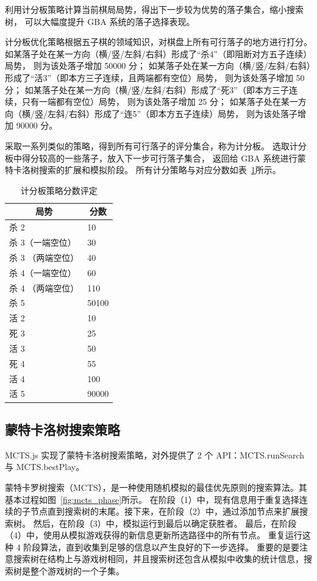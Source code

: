 \documentclass[UTF8,cs4size]{ctexart}
\begin{document}
利用计分板策略计算当前棋局局势，得出下一步较为优势的落子集合，缩小搜索树，
可以大幅度提升 GBA 系统的落子选择表现。

计分板优化策略根据五子棋的领域知识，对棋盘上所有可行落子的地方进行打分。
如某落子处在某一方向（横/竖/左斜/右斜）形成了“杀4”（即阻断对方五子连续）局势，
则为该处落子增加 50000 分；
如某落子处在某一方向（横/竖/左斜/右斜）形成了“活3”（即本方三子连续，且两端都有空位）局势，
则为该处落子增加 50 分；
如某落子处在某一方向（横/竖/左斜/右斜）形成了“死3”（即本方三子连续，只有一端都有空位）局势，
则为该处落子增加 25 分；
如某落子处在某一方向（横/竖/左斜/右斜）形成了“连5”（即本方五子连续）局势，
则为该处落子增加 90000 分。

采取一系列类似的策略，得到所有可行落子的评分集合，称为计分板。
选取计分板中得分较高的一些落子，放入下一步可行落子集合，
返回给 GBA 系统进行蒙特卡洛树搜索的扩展和模拟阶段。
所有计分策略与对应分数如表~\ref{tab:score_board}所示。

\begin{table}[htbp]
  \caption{计分板策略分数评定}
  \label{tab:score_board}
  \centering
  \begin{tabular}[c]{l|l}
    \hline
    \multicolumn{1}{c|}{\textbf{局势}} & 
    \multicolumn{1}{c}{\textbf{分数}} \\
    \hline
	  杀 2 & 10 \\
	  杀 3（一端空位）& 30 \\
	  杀 3 （两端空位）& 40 \\
	  杀 4（一端空位）& 60 \\
	  杀 4 （两端空位）& 110 \\
	  杀 5 & 50100 \\
	  活 2 & 10 \\
	  死 3 & 25 \\
	  活 3 & 50 \\
	  死 4 & 55 \\
	  活 4 & 100 \\
	  活 5 & 90000 \\
   \hline
  \end{tabular}
\end{table}


\subsection{蒙特卡洛树搜索策略}
MCTS.js 实现了蒙特卡洛树搜索策略，对外提供了 2 个 API：MCTS.runSearch 与 MCTS.bestPlay。

蒙特卡罗树搜索（MCTS），是一种使用随机模拟的最佳优先原则的搜索算法。其基本过程如图~\ref{fig:mcts_phase}所示。
在阶段（1）中，现有信息用于重复选择连续的子节点直到搜索树的末尾。接下来，在阶段（2）中，通过添加节点来扩展搜索树。
然后，在阶段（3）中，模拟运行到最后以确定获胜者。
最后，在阶段（4）中，使用从模拟游戏获得的新信息更新所选路径中的所有节点。
重复运行这种 4 阶段算法，直到收集到足够的信息以产生良好的下一步选择。
重要的是要注意搜索树在结构上与游戏树相同，并且搜索树还包含从模拟中收集的统计信息，搜索树是整个游戏树的一个子集。
\end{document}
